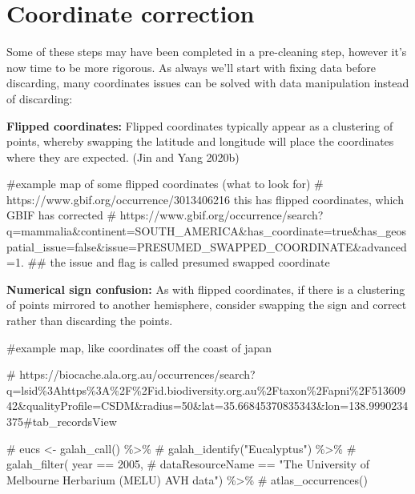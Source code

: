 \documentclass[
  letterpaper,
  DIV=11,
  numbers=noendperiod,
  oneside]{scrreprt}
\newenvironment{Shaded}{\begin{snugshade}}{\end{snugshade}}
\newcommand{\CommentTok}[1]{\textcolor[rgb]{0.37,0.37,0.37}{#1}}
\begin{document}
\hypertarget{coordinate-correction}{%
\section{Coordinate correction}\label{coordinate-correction}}

Some of these steps may have been completed in a pre-cleaning step,
however it's now time to be more rigorous. As always we'll start with
fixing data before discarding, many coordinates issues can be solved
with data manipulation instead of discarding:

\textbf{Flipped coordinates:} Flipped coordinates typically appear as a
clustering of points, whereby swapping the latitude and longitude will
place the coordinates where they are expected. (Jin and Yang 2020b)

\begin{Shaded}
\begin{Highlighting}[]
\CommentTok{\#example map of some flipped coordinates (what to look for) }
\CommentTok{\# https://www.gbif.org/occurrence/3013406216 this has flipped coordinates, which GBIF has corrected}
\CommentTok{\# https://www.gbif.org/occurrence/search?q=mammalia\&continent=SOUTH\_AMERICA\&has\_coordinate=true\&has\_geospatial\_issue=false\&issue=PRESUMED\_SWAPPED\_COORDINATE\&advanced=1. \#\# the issue and flag is called \textquotesingle{}presumed swapped coordinate\textquotesingle{} }
\end{Highlighting}
\end{Shaded}

\textbf{Numerical sign confusion:} As with flipped coordinates, if there
is a clustering of points mirrored to another hemisphere, consider
swapping the sign and correct rather than discarding the points.

\begin{Shaded}
\begin{Highlighting}[]
\CommentTok{\#example map, like coordinates off the coast of japan}

\CommentTok{\# https://biocache.ala.org.au/occurrences/search?q=lsid\%3Ahttps\%3A\%2F\%2Fid.biodiversity.org.au\%2Ftaxon\%2Fapni\%2F51360942\&qualityProfile=CSDM\&radius=50\&lat=35.66845370835343\&lon=138.9990234375\#tab\_recordsView}

\CommentTok{\# eucs \textless{}{-} galah\_call() \%\textgreater{}\% }
\CommentTok{\#  galah\_identify("Eucalyptus") \%\textgreater{}\%}
\CommentTok{\#  galah\_filter( year == 2005, }
\CommentTok{\#             dataResourceName == "The University of Melbourne Herbarium (MELU) AVH data") \%\textgreater{}\%}
\CommentTok{\#  atlas\_occurrences()}
\end{Highlighting}
\end{Shaded}
\end{document}
